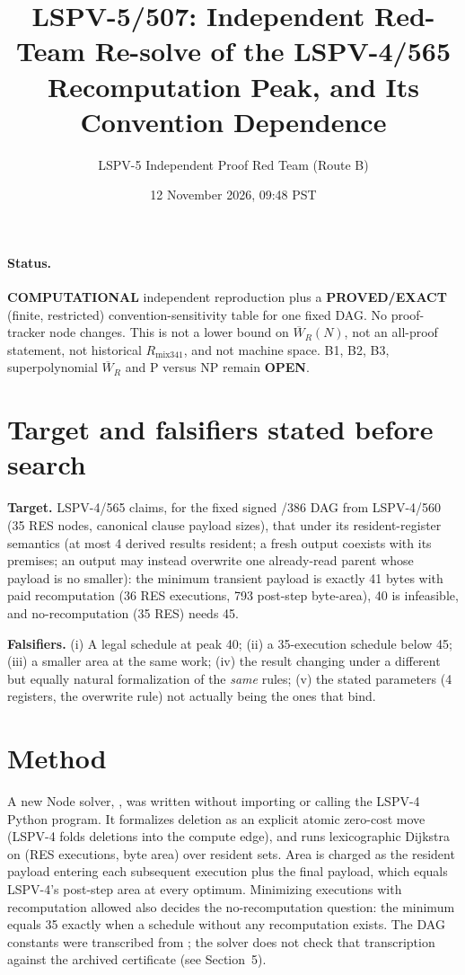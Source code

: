 \documentclass[11pt]{article}
\title{LSPV-5/507: Independent Red-Team Re-solve of the LSPV-4/565 Recomputation Peak, and Its Convention Dependence}
\author{LSPV-5 Independent Proof Red Team (Route B)}
\date{12 November 2026, 09:48 PST}
\begin{document}
\maketitle

\paragraph{Status.} \textbf{COMPUTATIONAL} independent reproduction plus a \textbf{PROVED/EXACT} (finite, restricted) convention-sensitivity table for one fixed DAG.  No proof-tracker node changes.  This is not a lower bound on $\overline W_R(N)$, not an all-proof statement, not historical $R_{\mathrm{mix341}}$, and not machine space.  B1, B2, B3, superpolynomial $\overline W_R$ and P versus NP remain \textbf{OPEN}.

\section{Target and falsifiers stated before search}
\textbf{Target.} LSPV-4/565 claims, for the fixed signed /386 DAG from LSPV-4/560 (35 RES nodes, canonical clause payload sizes), that under its resident-register semantics (at most 4 derived results resident; a fresh output coexists with its premises; an output may instead overwrite one already-read parent whose payload is no smaller): the minimum transient payload is exactly 41 bytes with paid recomputation (36 RES executions, 793 post-step byte-area), 40 is infeasible, and no-recomputation (35 RES) needs 45.

\textbf{Falsifiers.} (i) A legal schedule at peak 40; (ii) a 35-execution schedule below 45; (iii) a smaller area at the same work; (iv) the result changing under a different but equally natural formalization of the \emph{same} rules; (v) the stated parameters (4 registers, the overwrite rule) not actually being the ones that bind.

\section{Method}
A new Node solver, , was written without importing or calling the LSPV-4 Python program.  It formalizes deletion as an explicit atomic zero-cost move (LSPV-4 folds deletions into the compute edge), and runs lexicographic Dijkstra on (RES executions, byte area) over resident sets.  Area is charged as the resident payload entering each subsequent execution plus the final payload, which equals LSPV-4's post-step area at every optimum.  Minimizing executions with recomputation allowed also decides the no-recomputation question: the minimum equals 35 exactly when a schedule without any recomputation exists.  The DAG constants were transcribed from ; the solver does not check that transcription against the archived certificate (see Section~5).
\end{document}
